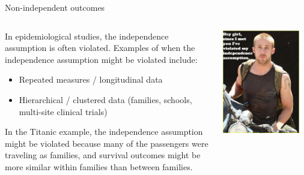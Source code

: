 \documentclass[ignorenonframetext,]{beamer}
\begin{document}
\begin{frame}{Non-independent outcomes}

\begin{columns}
\begin{column}{0.54\textwidth}
\small
In epidemiological studies, the independence assumption is often violated. Examples of when the independence assumption might be violated include:
\begin{itemize}
  \item Repeated measures / longitudinal data
  \item Hierarchical / clustered data (families, schools, multi-site clinical trials)
\end{itemize}
In the Titanic example, the independence assumption might be violated because many of the passengers were traveling as families, and survival outcomes might be more similar within families than between families.
\end{column}

\begin{column}{0.45\textwidth}
\includegraphics[width = 0.9\textwidth]{images/independence_assumption.jpg}
\end{column}
\end{columns}

\end{frame}
\end{document}
